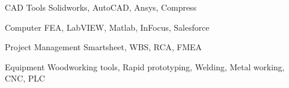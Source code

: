 

\begin{cvskills}

  \cvskill
    {CAD Tools} %
    {Solidworks, AutoCAD, Ansys, Compress} %

  \cvskill
    {Computer} %
    {FEA, LabVIEW, Matlab, InFocus, Salesforce} %

  \cvskill
    {Project Management} %
    {Smartsheet, WBS, RCA, FMEA} %

  \cvskill
    {Equipment} %
    {Woodworking tools, Rapid prototyping, Welding, Metal working, CNC, PLC} %



\end{cvskills}
